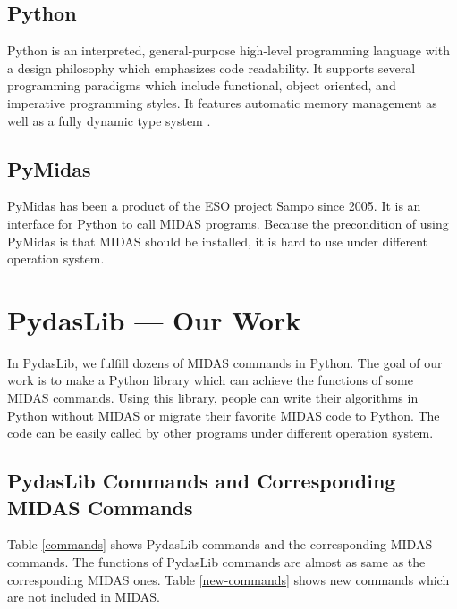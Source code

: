           \subsection{Python}
Python is an interpreted, general-purpose high-level programming language with a design philosophy which emphasizes code readability. It supports several programming paradigms which include functional, object oriented, and imperative programming styles. It features automatic memory management as well as a fully dynamic type system \citep{python_web}. 

          \subsection{PyMidas}
PyMidas has been a product of the ESO project Sampo since 2005. It is an interface for Python to call MIDAS programs. Because the precondition of using PyMidas is that MIDAS should be installed, it is hard to use under different operation system.

          \section{PydasLib --- Our Work}
In PydasLib, we fulfill dozens of MIDAS commands in Python. The goal of our work is to make a Python library which can achieve the functions of some MIDAS commands. Using this library, people can write their algorithms in Python without MIDAS or migrate their favorite MIDAS code to Python. The code can be easily called by other programs under different operation system. 

	  \subsection{PydasLib Commands and Corresponding MIDAS Commands}
Table \ref{commands} shows PydasLib commands and the corresponding MIDAS commands. The functions of PydasLib commands are almost as same as the corresponding MIDAS ones. Table \ref{new-commands} shows new commands which are not included in MIDAS. 

